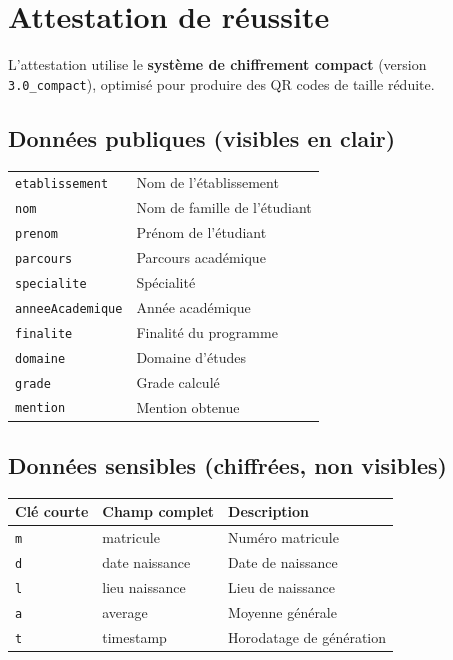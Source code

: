 \documentclass[a4paper,11pt]{article}
\begin{document}
\section{Attestation de r\'eussite}

L'attestation utilise le \textbf{syst\`eme de chiffrement compact} (version \texttt{3.0\_compact}), optimis\'e pour produire des QR codes de taille r\'eduite.

\subsection{Donn\'ees publiques (visibles en clair)}

\begin{tcolorbox}[colback=green!5, colframe=publicgreen, title={\textcolor{publicgreen}{\textbf{Champs visibles lors du scan}}}]
\begin{longtable}{p{4.5cm}p{8cm}}
\texttt{etablissement} & Nom de l'\'etablissement \\
\texttt{nom} & Nom de famille de l'\'etudiant \\
\texttt{prenom} & Pr\'enom de l'\'etudiant \\
\texttt{parcours} & Parcours acad\'emique \\
\texttt{specialite} & Sp\'ecialit\'e \\
\texttt{anneeAcademique} & Ann\'ee acad\'emique \\
\texttt{finalite} & Finalit\'e du programme \\
\texttt{domaine} & Domaine d'\'etudes \\
\texttt{grade} & Grade calcul\'e \\
\texttt{mention} & Mention obtenue \\
\end{longtable}
\end{tcolorbox}

\subsection{Donn\'ees sensibles (chiffr\'ees, non visibles)}

\begin{tcolorbox}[colback=red!5, colframe=encryptedred, title={\textcolor{encryptedred}{\textbf{Champs chiffr\'es (AES-128-ECB)}}}]
\begin{longtable}{p{3cm}p{4cm}p{5.5cm}}
\textbf{Cl\'e courte} & \textbf{Champ complet} & \textbf{Description} \\
\midrule
\texttt{m} & matricule & Num\'ero matricule \\
\texttt{d} & date naissance & Date de naissance \\
\texttt{l} & lieu naissance & Lieu de naissance \\
\texttt{a} & average & Moyenne g\'en\'erale \\
\texttt{t} & timestamp & Horodatage de g\'en\'eration \\
\end{longtable}
\end{tcolorbox}
\end{document}
